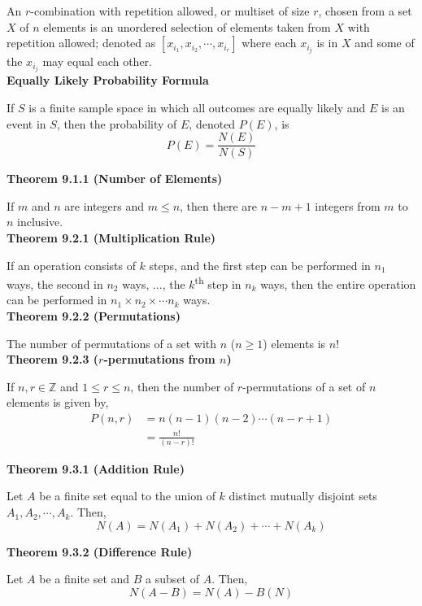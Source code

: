 \documentclass[a4paper]{article}
\newcommand{\subheading}[1]{{\scriptsize\textbf{#1}}}
\begin{document}
\begin{multicols*}{4}
An $r$-combination with repetition allowed, or multiset of size $r$, chosen from
a set $X$ of $n$ elements is an unordered selection of elements taken from $X$
with repetition allowed; denoted as $[x_{i_1}, x_{i_2}, \cdots, x_{i_r}]$ where
each $x_{i_j}$ is in $X$ and some of the $x_{i_j}$ may equal each other.\\

\subheading{Equally Likely Probability Formula}

If $S$ is a finite sample space in which all outcomes are equally likely and $E$
is an event in $S$, then the probability of $E$, denoted $P(E)$, is
$$P(E) = \frac{N(E)}{N(S)}$$

\subheading{Theorem 9.1.1 (Number of Elements)}

If $m$ and $n$ are integers and $m \leq n$, then there are $n-m+1$ integers from
$m$ to $n$ inclusive.\\

\subheading{Theorem 9.2.1 (Multiplication Rule)}

If an operation consists of $k$ steps, and the first step can be performed in
$n_1$ ways, the second in $n_2$ ways, ..., the $k$\textsuperscript{th} step
in $n_k$ ways, then the entire operation can be performed in $n_1 \times n_2
\times \cdots n_k$ ways.\\

\subheading{Theorem 9.2.2 (Permutations)}

The number of permutations of a set with $n$ ($n \geq 1$) elements is $n!$\\

\subheading{Theorem 9.2.3 ($r$-permutations from $n$)}

If $n, r \in \mathbb{Z}$ and $1 \leq r \leq n$, then the number of
$r$-permutations of a set of $n$ elements is given by,
\begin{align*}
  P(n, r) &= n(n-1)(n-2)\cdots(n-r+1) \\
          &= \frac{n!}{(n-r)!}
\end{align*}

\subheading{Theorem 9.3.1 (Addition Rule)}

Let $A$ be a finite set equal to the union of $k$ distinct mutually disjoint
sets $A_1, A_2, \cdots, A_k$. Then, $$N(A) = N(A_1) + N(A_2) + \cdots + N(A_k)$$

\subheading{Theorem 9.3.2 (Difference Rule)}

Let $A$ be a finite set and $B$ a subset of $A$. Then,
$$N(A-B) = N(A) - B(N)$$


\end{multicols*}
\end{document}
